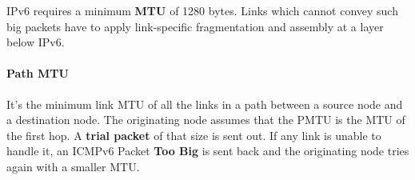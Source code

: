 \begin{observation}[Length]
	IPv6 requires a minimum \textbf{MTU} of 1280 bytes. Links which cannot convey such big packets have to apply link-specific fragmentation and assembly at a layer below IPv6.
\end{observation}

\paragraph{Path MTU} It's the minimum link MTU of all the links in a path between a source node and a destination node. The originating node assumes that the PMTU is the MTU of the first hop. A \textbf{trial packet} of that size is sent out. If any link is unable to handle it, an ICMPv6 Packet \textbf{Too Big} is sent back and the originating node tries again with a smaller MTU.

